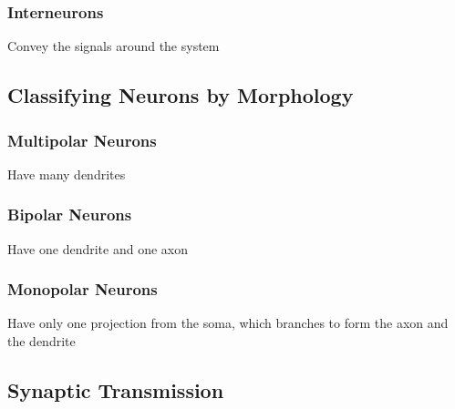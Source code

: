\subsubsection{Interneurons}
Convey the signals around the system

\subsection{Classifying Neurons by Morphology}
\subsubsection{Multipolar Neurons}
Have many dendrites
\subsubsection{Bipolar Neurons 
}
Have one dendrite and one axon
\subsubsection{Monopolar Neurons}
Have only one projection from the soma, which branches to form the axon and the dendrite

\subsection{Synaptic Transmission}
